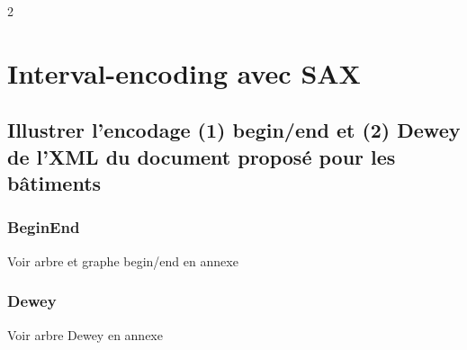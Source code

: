 2\chapter{Interval-encoding avec SAX}
\section{Illustrer l’encodage (1) begin/end et (2) Dewey de l’XML du document proposé pour les bâtiments}
\subsection{BeginEnd}
Voir arbre et graphe begin/end en annexe

\subsection{Dewey}
Voir arbre Dewey en annexe
